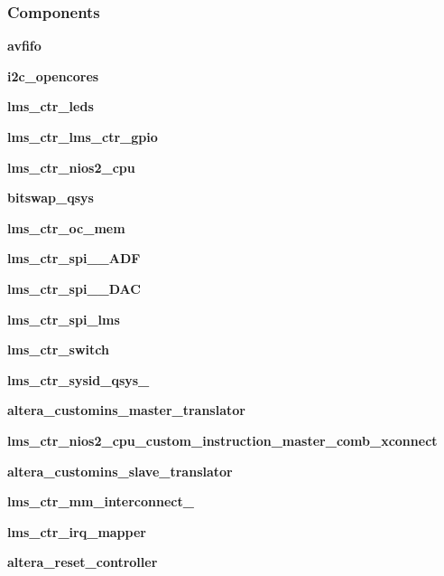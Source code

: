 \subsubsection*{Components}
 \begin{DoxyCompactItemize}
\item 
{\bf avfifo}  {\bfseries }  
\item 
{\bf i2c\+\_\+opencores}  {\bfseries }  
\item 
{\bf lms\+\_\+ctr\+\_\+leds}  {\bfseries }  
\item 
{\bf lms\+\_\+ctr\+\_\+lms\+\_\+ctr\+\_\+gpio}  {\bfseries }  
\item 
{\bf lms\+\_\+ctr\+\_\+nios2\+\_\+cpu}  {\bfseries }  
\item 
{\bf bitswap\+\_\+qsys}  {\bfseries }  
\item 
{\bf lms\+\_\+ctr\+\_\+oc\+\_\+mem}  {\bfseries }  
\item 
{\bf lms\+\_\+ctr\+\_\+spi\+\_\+\_\+\+A\+DF}  {\bfseries }  
\item 
{\bf lms\+\_\+ctr\+\_\+spi\+\_\+\_\+\+D\+AC}  {\bfseries }  
\item 
{\bf lms\+\_\+ctr\+\_\+spi\+\_\+lms}  {\bfseries }  
\item 
{\bf lms\+\_\+ctr\+\_\+switch}  {\bfseries }  
\item 
{\bf lms\+\_\+ctr\+\_\+sysid\+\_\+qsys\+\_}  {\bfseries }  
\item 
{\bf altera\+\_\+customins\+\_\+master\+\_\+translator}  {\bfseries }  
\item 
{\bf lms\+\_\+ctr\+\_\+nios2\+\_\+cpu\+\_\+custom\+\_\+instruction\+\_\+master\+\_\+comb\+\_\+xconnect}  {\bfseries }  
\item 
{\bf altera\+\_\+customins\+\_\+slave\+\_\+translator}  {\bfseries }  
\item 
{\bf lms\+\_\+ctr\+\_\+mm\+\_\+interconnect\+\_}  {\bfseries }  
\item 
{\bf lms\+\_\+ctr\+\_\+irq\+\_\+mapper}  {\bfseries }  
\item 
{\bf altera\+\_\+reset\+\_\+controller}  {\bfseries }  
\end{DoxyCompactItemize}
